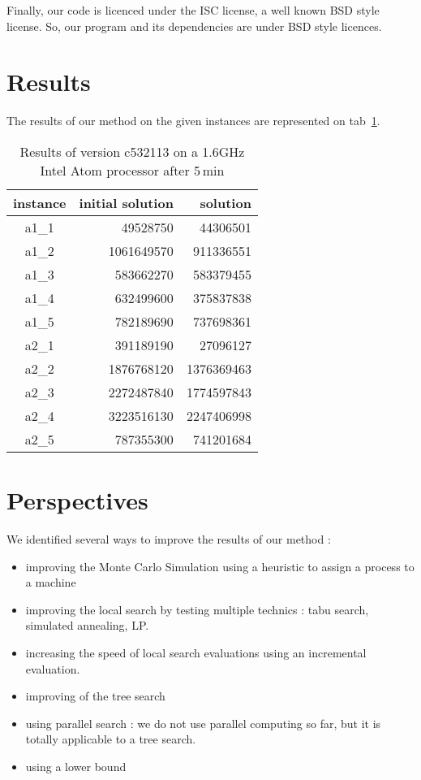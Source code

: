 \documentclass[a4paper,twocolumn]{article}
\begin{document}
Finally, our code is licenced under the ISC license, a well known BSD
style license.  So, our program and its dependencies are under BSD
style licences.

\section{Results}

The results of our method on the given instances are represented on
tab~\ref{tab:results}.

\begin{table}
  \centering
  \label{tab:results}
  \caption{Results of version c532113 on a 1.6GHz Intel Atom processor
    after 5\,min}
  \begin{tabular}{|c|r|r|}
    \hline
    instance & initial solution & solution\\
    \hline
    a1\_1 &   49528750 &   44306501\\
    a1\_2 & 1061649570 &  911336551\\
    a1\_3 &  583662270 &  583379455\\
    a1\_4 &  632499600 &  375837838\\
    a1\_5 &  782189690 &  737698361\\
    a2\_1 &  391189190 &   27096127\\
    a2\_2 & 1876768120 & 1376369463\\
    a2\_3 & 2272487840 & 1774597843\\
    a2\_4 & 3223516130 & 2247406998\\
    a2\_5 &  787355300 &  741201684\\
    \hline
  \end{tabular}
\end{table}

\section{Perspectives}

We identified several ways to improve the results of our method :
\begin{itemize}
\item improving the Monte Carlo Simulation using a heuristic to assign
a process to a machine
\item improving the local search by testing multiple technics : tabu search, simulated annealing, LP.
\item increasing the speed of local search evaluations using an incremental evaluation.
\item improving of the tree search
\item using parallel search : we do not use parallel computing so far, but it is totally applicable to a tree search.
\item using a lower bound
\end{itemize}
\end{document}
